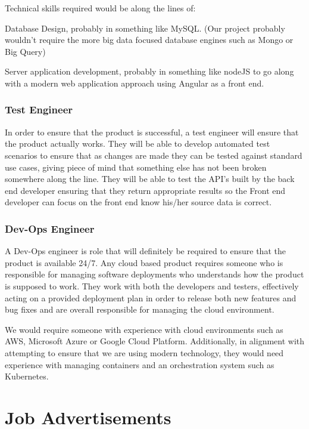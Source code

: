 \documentclass[11pt, oneside, a4paper, titlepage]{article}
\begin{document}
Technical skills required would be along the lines of: 

Database Design, probably in something like MySQL. (Our project probably wouldn't require the more big data focused database engines such as Mongo or Big Query) 

Server application development, probably in something like nodeJS to go along with a modern web application approach using Angular as a front end. 

\subsubsection{Test Engineer}
In order to ensure that the product is successful, a test engineer will ensure that the product actually works.  They will be able to develop automated test scenarios to ensure that as changes are made they can be tested against standard use cases, giving piece of mind that something else has not been broken somewhere along the line.  They will be able to test the API's built by the back end developer ensuring that they return appropriate results so the Front  end developer can focus on the front end know his/her source data is correct. 

\subsubsection{Dev-Ops Engineer}
A Dev-Ops engineer is role that will definitely be required to ensure that the product is available 24/7.  Any cloud based product requires someone who is responsible for managing software deployments who understands how the product is supposed to work.  They work with both the developers and testers, effectively acting on a provided deployment plan in order to release both new features and bug fixes and are overall responsible for managing the cloud environment. 

We would require someone with experience with cloud environments such as AWS, Microsoft Azure or Google Cloud Platform.  Additionally, in alignment with attempting to ensure that we are using modern technology, they would need experience with managing containers and an orchestration system such as Kubernetes. 
\newpage

\section{Job Advertisements}
\end{document}
